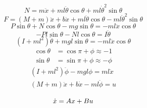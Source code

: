 \documentclass[../cover.tex]{subfiles}
\begin{document}
            \begin{equation}
                N = m\ddot{x} + ml\ddot{\theta}\cos{\theta} + ml\dot{\theta}^2\sin{\theta}
                \label{persamaan_9}
            \end{equation}
            \begin{equation}
                F = (M + m)\ddot{x} + b\dot{x} + ml\ddot{\theta}\cos{\theta} - ml\dot{\theta}^2\sin{\theta}
            \end{equation}
            \begin{equation}
                    P\sin{\theta} + N\cos{\theta} - mg\sin{\theta} = -ml\ddot{x}\cos{\theta}
            \end{equation}
            \begin{equation}
                -Pl\sin{\theta} - Nl\cos{\theta} = I\ddot{\theta}
            \end{equation}
            \begin{equation}
                (I + ml^2)\ddot{\theta} + mgl\sin{\theta} = -ml\ddot{x}\cos{\theta}
            \end{equation}
            \begin{equation}
                \begin{split}
                    \cos{\theta} &= \cos{\pi + \phi} \approx -1 \\[5pt]
                    \sin{\theta} &= \sin{\pi + \phi} \approx -\phi
                \end{split}
            \end{equation}
            \begin{equation}
                \begin{split}
                    (I+ml^2)\ddot{\phi} - mgl\phi = ml\ddot{x} \\[5pt]
                    (M+m)\ddot{x} + b\dot{x} - ml\ddot{\phi} = u \\[10pt]
                \end{split}
            \end{equation}
            \begin{equation*}
                \dot{x} = Ax+Bu \\[5pt]
            \end{equation*}
\end{document}
